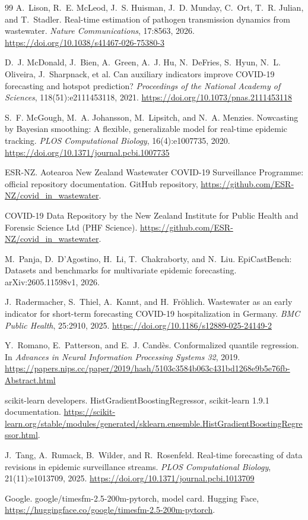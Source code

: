 \documentclass[11pt]{article}
\begin{document}
\begin{thebibliography}{99}
 A.~Lison, R.~E. McLeod, J.~S. Huisman, J.~D. Munday, C.~Ort, T.~R. Julian, and T.~Stadler. Real-time estimation of pathogen transmission dynamics from wastewater. \emph{Nature Communications}, 17:8563, 2026. \url{https://doi.org/10.1038/s41467-026-75380-3}

 D.~J. McDonald, J.~Bien, A.~Green, A.~J. Hu, N.~DeFries, S.~Hyun, N.~L. Oliveira, J.~Sharpnack, et al. Can auxiliary indicators improve COVID-19 forecasting and hotspot prediction? \emph{Proceedings of the National Academy of Sciences}, 118(51):e2111453118, 2021. \url{https://doi.org/10.1073/pnas.2111453118}

 S.~F. McGough, M.~A. Johansson, M.~Lipsitch, and N.~A. Menzies. Nowcasting by Bayesian smoothing: A flexible, generalizable model for real-time epidemic tracking. \emph{PLOS Computational Biology}, 16(4):e1007735, 2020. \url{https://doi.org/10.1371/journal.pcbi.1007735}

 ESR-NZ. Aotearoa New Zealand Wastewater COVID-19 Surveillance Programme: official repository documentation. GitHub repository, \url{https://github.com/ESR-NZ/covid_in_wastewater}.

 COVID-19 Data Repository by the New Zealand Institute for Public Health and Forensic Science Ltd (PHF Science). \url{https://github.com/ESR-NZ/covid_in_wastewater}.

 M.~Panja, D.~D'Agostino, H.~Li, T.~Chakraborty, and N.~Liu. EpiCastBench: Datasets and benchmarks for multivariate epidemic forecasting. arXiv:2605.11598v1, 2026.

 J.~Radermacher, S.~Thiel, A.~Kannt, and H.~Fr\"ohlich. Wastewater as an early indicator for short-term forecasting COVID-19 hospitalization in Germany. \emph{BMC Public Health}, 25:2910, 2025. \url{https://doi.org/10.1186/s12889-025-24149-2}

 Y.~Romano, E.~Patterson, and E.~J. Cand\`es. Conformalized quantile regression. In \emph{Advances in Neural Information Processing Systems 32}, 2019. \url{https://papers.nips.cc/paper/2019/hash/5103c3584b063c431bd1268e9b5e76fb-Abstract.html}

 scikit-learn developers. HistGradientBoostingRegressor, scikit-learn 1.9.1 documentation. \url{https://scikit-learn.org/stable/modules/generated/sklearn.ensemble.HistGradientBoostingRegressor.html}.

 J.~Tang, A.~Rumack, B.~Wilder, and R.~Rosenfeld. Real-time forecasting of data revisions in epidemic surveillance streams. \emph{PLOS Computational Biology}, 21(11):e1013709, 2025. \url{https://doi.org/10.1371/journal.pcbi.1013709}

 Google. google/timesfm-2.5-200m-pytorch, model card. Hugging Face, \url{https://huggingface.co/google/timesfm-2.5-200m-pytorch}.

\end{thebibliography}
\end{document}
